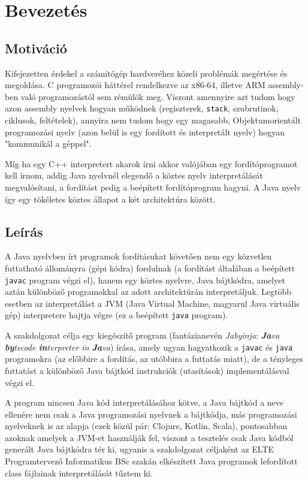 \chapter{Bevezetés}
\label{ch:intro}

\section{Motiváció}

Kifejezetten érdekel a számítógép hardveréhez közeli problémák megértése és megoldása. C programozói háttérel rendelkezve az x86-64, illetve ARM assembly-ben való programozástól sem rémülök meg. Viszont amennyire azt tudom hogy azon assembly nyelvek hogyan működnek (regiszterek, \lstinline{stack}, szubrutinok, ciklusok, feltételek), annyira nem tudom hogy egy magasabb, Objektumorientált programozási nyelv (azon belül is egy fordított és interpretált nyelv) hogyan "kommunikál a géppel".

Míg ha egy C++ interpretert akarok írni akkor valójában egy fordítóprogramot kell írnom, addig Java nyelvnél elegendő a köztes nyelv interpretálását megvalósítani, a fordítást pedig a beépített fordítóprogram hagyni. A Java nyelv így egy tökéletes köztes állapot a két architektúra között.

\section{Leírás}

A Java nyelvben írt programok fordításukat követően nem egy közvetlen futtatható állományra (gépi kódra) fordulnak (a fordítást általában a beépített \lstinline{javac} program végzi el), hanem egy köztes nyelvre, Java bájtkódra, amelyet aztán különböző programokkal az adott architektúrán interpretáljuk. Legtöbb esetben az interpretálást a JVM (Java Virtual Machine, magyarul Java virtuális gép) interpretere hajtja végre (ez a beépített \lstinline{java} program).

A szakdolgozat célja egy kiegészítő program (fantázianevén \textit{Jabyinja}: \textit{\textbf{Ja}va \textbf{by}tecode \textbf{in}terpreter in \textbf{Ja}va}) írása, amely ugyan hagyatkozik a \lstinline{javac} és \lstinline{java} programokra (az előbbire a fordítás, az utóbbira a futtatás miatt), de a tényleges futtatást a különböző Java bájtkód instrukciók (utasítások) implementálásval végzi el.

A program nincsen Java kód interpretálásához kötve, a Java bájtkód a neve ellenére nem csak a Java programozási nyelvnek a bájtkódja, más programozási nyelveknek is az alapja (ezek közül pár: Clojure, Kotlin, Scala), pontosabban azoknak amelyek a JVM-et használják fel, viszont a tesztelés csak Java kódból generált Java bájtkódra tér ki, ugyanis a szakdolgozat céljaként az ELTE Programtervező Informatikus BSc szakán elkészített Java programok lefordított class fájlainak interpretálását tűztem ki.

